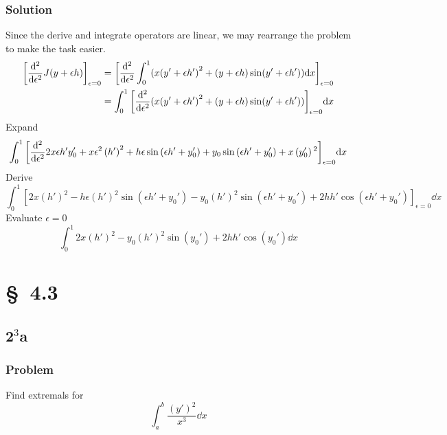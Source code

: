 \documentclass[12pt,twoside]{article}
\begin{document}
\subsubsection*{Solution}
Since the derive and integrate operators are linear, we may rearrange the
problem to make the task easier.
\begin{equation*}
  \begin{aligned}
    {\left[\od[2]{}{\epsilon} J(y+\epsilon h)\right]}_{\epsilon=0}
    &= {\left[\od[2]{}{\epsilon} \int_0^1(x{(y'+\epsilon h')}^2+(y+\epsilon h)\sin(y'+\epsilon h'))\dd{x} \right]}_{\epsilon=0} \\
    &= \int_0^1{\left[\od[2]{}{\epsilon} (x{(y'+\epsilon h')}^2+(y+\epsilon h)\sin(y'+\epsilon h'))\right]}_{\epsilon=0}\dd{x} \\
  \end{aligned}
\end{equation*}
Expand
\begin{equation*}
  \int_0^1{\left[\od[2]{}{\epsilon}
      2 x \epsilon h' y_0'+x \epsilon ^2 \left(h'\right)^2+h \epsilon \sin
      \left(\epsilon h'+y_0'\right)+y_0 \sin \left(\epsilon h'+y_0'\right)+x
      \left(y_0'\right){}^2
    \right]}_{\epsilon=0}\dd{x}
\end{equation*}
Derive
\begin{equation*}
  \int_0^1{\left[
      2 x \left(h'\right)^2-h \epsilon \left(h'\right)^2 \sin \left(\epsilon
        h'+y_0'\right)-y_0 \left(h'\right)^2 \sin \left(\epsilon h'+y_0'\right)+2 h h'
      \cos \left(\epsilon h'+y_0'\right)
    \right]}_{\epsilon=0}\dd{x}
\end{equation*}
Evaluate $\epsilon=0$
\begin{equation*}
  \boxed{\int_0^1
      2 x \left(h'\right)^2-y_0 \left(h'\right)^2 \sin \left(y_0'\right)+2 h h'
      \cos \left(y_0'\right)
    \dd{x}}
\end{equation*}

\section{\S~4.3}
\subsection{2$^3$a}
\subsubsection*{Problem}
Find extremals for
\begin{equation}
  \label{eq:4.3.2a-problem}
  \int_a^b \frac{{(y')}^2}{x^3}\dd{x}
\end{equation}
\end{document}
